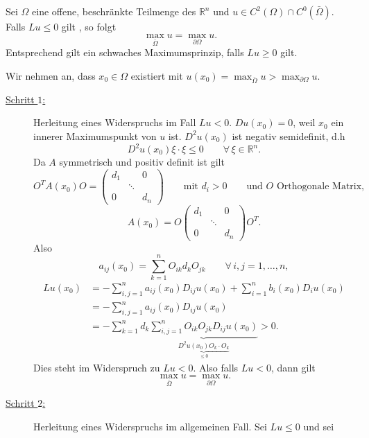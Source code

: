 \begin{satz}
	Sei $\Omega$ eine offene, beschränkte Teilmenge des $\mathbb{R}^n$ und $u \in C^2(\Omega) \cap C^0(\bar{\Omega})$. Falls $Lu \leq 0$ gilt , so folgt
	\begin{equation}
		\max_{\bar \Omega}u = \max_{ \partial \Omega}u.
	\end{equation}
	Entsprechend gilt ein schwaches Maximumsprinzip, falls $Lu \geq 0$ gilt.
\end{satz}
\begin{beweis}
	Wir nehmen an, dass $x_0 \in \Omega$ existiert mit $u(x_0)= \max_{\bar{\Omega}}u > \max_{ \partial \Omega}u$.
	\begin{description}
		\item[\underline{Schritt $1$:}]Herleitung eines Widerspruchs im Fall $Lu < 0$. $Du(x_0)=0$, weil $x_0$ ein innerer Maximumspunkt von $u$ ist. $D^2u(x_0)$ ist negativ semidefinit, d.h 
		\begin{equation}
			D^2u(x_0) \xi \cdot \xi \leq 0 \qquad \forall\, \xi \in \mathbb{R}^n.
		\end{equation}  
		Da $A$ symmetrisch und positiv definit ist gilt 
		\[
			O^T A(x_0) O = \begin{pmatrix}
				d_1 & & 0 \\ & \ddots & \\ 0 & & d_n
			\end{pmatrix} \qquad \text{mit } d_i > 0 \qquad \text{und } O \text{ Orthogonale Matrix,}
		\]
		\[
			A(x_0)= O \begin{pmatrix}
				d_1 & & 0 \\ & \ddots & \\ 0 & & d_n
			\end{pmatrix} O^T.
		\]
		Also
		\[
			a_{ij}(x_0) = \sum^{n}_{k=1}O_{ik}d_kO_{jk} \qquad \forall\, i,j=1,\dots,n,
		\]
		\begin{align*}
			Lu(x_0) &= - \sum^{n}_{i,j=1} a_{ij}(x_0) D_{ij}u(x_0) + \sum^{n}_{i=1}b_i(x_0)D_iu(x_0)  \\
			&= - \sum^{n}_{i,j=1} a_{ij}(x_0)D_{ij}u(x_0) \\
			&= - \sum_{k=1}^{n} d_k \underset{\underset{\leq 0}{\underbrace{D^2u(x_0)O_k \cdot O_k}}}{\underbrace{\sum^{n}_{i,j=1} O_{ik}O_{jk} D_{ij}u(x_0)}} > 0.
		\end{align*}
		Dies steht im Widerspruch zu $Lu < 0$. Also falls $Lu < 0$, dann gilt
		\[
			\max_{\bar{\Omega}}u = \max_{ \partial \Omega}u.
		\]
		\item[\underline{Schritt $2$:}] Herleitung eines Widerspruchs im allgemeinen Fall. Sei $Lu \leq 0$ und sei 

\end{description}
\end{beweis}
